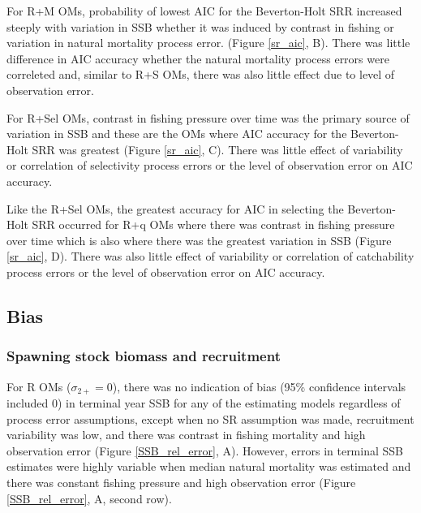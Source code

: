 \documentclass[
  12pt,
]{article}
\begin{document}
For R+M OMs, probability of lowest AIC for the Beverton-Holt SRR
increased steeply with variation in SSB whether it was induced by
contrast in fishing or variation in natural mortality process error.
(Figure \ref{sr_aic}, B). There was little difference in AIC accuracy
whether the natural mortality process errors were correleted and,
similar to R+S OMs, there was also little effect due to level of
observation error.

For R+Sel OMs, contrast in fishing pressure over time was the primary
source of variation in SSB and these are the OMs where AIC accuracy for
the Beverton-Holt SRR was greatest (Figure \ref{sr_aic}, C). There was
little effect of variability or correlation of selectivity process
errors or the level of observation error on AIC accuracy.

Like the R+Sel OMs, the greatest accuracy for AIC in selecting the
Beverton-Holt SRR occurred for R+q OMs where there was contrast in
fishing pressure over time which is also where there was the greatest
variation in SSB (Figure \ref{sr_aic}, D). There was also little effect
of variability or correlation of catchability process errors or the
level of observation error on AIC accuracy.

\hypertarget{bias-1}{%
\subsection*{Bias}\label{bias-1}}

\hypertarget{spawning-stock-biomass-and-recruitment}{%
\subsubsection*{Spawning stock biomass and
recruitment}\label{spawning-stock-biomass-and-recruitment}}

For R OMs (\(\sigma_{2+} = 0\)), there was no indication of bias (95\%
confidence intervals included 0) in terminal year SSB for any of the
estimating models regardless of process error assumptions, except when
no SR assumption was made, recruitment variability was low, and there
was contrast in fishing mortality and high observation error (Figure
\ref{SSB_rel_error}, A). However, errors in terminal SSB estimates were
highly variable when median natural mortality was estimated and there
was constant fishing pressure and high observation error (Figure
\ref{SSB_rel_error}, A, second row).
\end{document}
